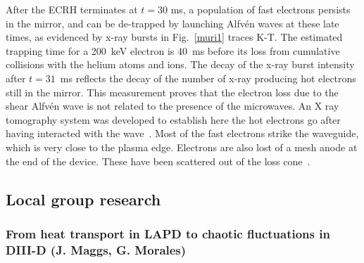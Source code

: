 \documentclass[11pt]{article}
\renewcommand{\cite}{\citep}
\begin{document}
After the ECRH terminates at $t = 30$ ms, a population of fast electrons
persists in the mirror, and can be de-trapped by launching Alfvén waves
at these late times, as evidenced by x-ray bursts in Fig.~\ref{muri1} traces K-T.
The estimated trapping time for a 200~keV electron is 40~ms before its
loss from cumulative collisions with the helium atoms and ions. The
decay of the x-ray burst intensity after $t = 31$~ms reflects the decay of
the number of x-ray producing hot electrons still in the mirror. This
measurement proves that the electron loss due to the shear Alfvén wave
is not related to the presence of the microwaves. An X ray tomography
system was developed to establish here the hot electrons go after having
interacted with the wave~\cite{wang:2013}. Most of the fast electrons strike the
waveguide, which is very close to the plasma edge. Electrons are also
lost of a mesh anode at the end of the device. These have been scattered
out of the loss cone~\cite{wang:2014}.




\subsection{Local group research}

\subsubsection{From heat transport in LAPD to chaotic fluctuations in DIII-D (J.
Maggs, G. Morales)}
\end{document}
